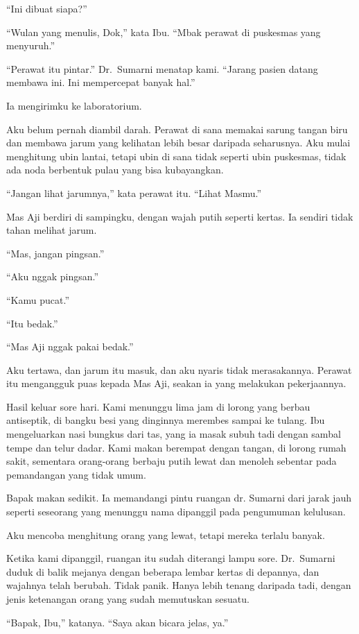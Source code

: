 \documentclass[11pt,twoside,openany]{book}
\makeatletter
\newcommand{\scenebreak}{\par\vspace{0.9em}{\centering\textsc{*\hspace{0.7em}*\hspace{0.7em}*}\par}\vspace{0.9em}\@afterindentfalse\@afterheading}
\makeatother
\begin{document}
``Ini dibuat siapa?''

``Wulan yang menulis, Dok,'' kata Ibu. ``Mbak perawat di puskesmas yang menyuruh.''

``Perawat itu pintar.'' Dr.~Sumarni menatap kami. ``Jarang pasien datang membawa ini. Ini mempercepat banyak hal.''

Ia mengirimku ke laboratorium.

Aku belum pernah diambil darah. Perawat di sana memakai sarung tangan biru dan membawa jarum yang kelihatan lebih besar daripada seharusnya. Aku mulai menghitung ubin lantai, tetapi ubin di sana tidak seperti ubin puskesmas, tidak ada noda berbentuk pulau yang bisa kubayangkan.

``Jangan lihat jarumnya,'' kata perawat itu. ``Lihat Masmu.''

Mas Aji berdiri di sampingku, dengan wajah putih seperti kertas. Ia sendiri tidak tahan melihat jarum.

``Mas, jangan pingsan.''

``Aku nggak pingsan.''

``Kamu pucat.''

``Itu bedak.''

``Mas Aji nggak pakai bedak.''

Aku tertawa, dan jarum itu masuk, dan aku nyaris tidak merasakannya. Perawat itu mengangguk puas kepada Mas Aji, seakan ia yang melakukan pekerjaannya.

\scenebreak
Hasil keluar sore hari. Kami menunggu lima jam di lorong yang berbau antiseptik, di bangku besi yang dinginnya merembes sampai ke tulang. Ibu mengeluarkan nasi bungkus dari tas, yang ia masak subuh tadi dengan sambal tempe dan telur dadar. Kami makan berempat dengan tangan, di lorong rumah sakit, sementara orang-orang berbaju putih lewat dan menoleh sebentar pada pemandangan yang tidak umum.

Bapak makan sedikit. Ia memandangi pintu ruangan dr. Sumarni dari jarak jauh seperti seseorang yang menunggu nama dipanggil pada pengumuman kelulusan.

Aku mencoba menghitung orang yang lewat, tetapi mereka terlalu banyak.

Ketika kami dipanggil, ruangan itu sudah diterangi lampu sore. Dr.~Sumarni duduk di balik mejanya dengan beberapa lembar kertas di depannya, dan wajahnya telah berubah. Tidak panik. Hanya lebih tenang daripada tadi, dengan jenis ketenangan orang yang sudah memutuskan sesuatu.

``Bapak, Ibu,'' katanya. ``Saya akan bicara jelas, ya.''
\end{document}
